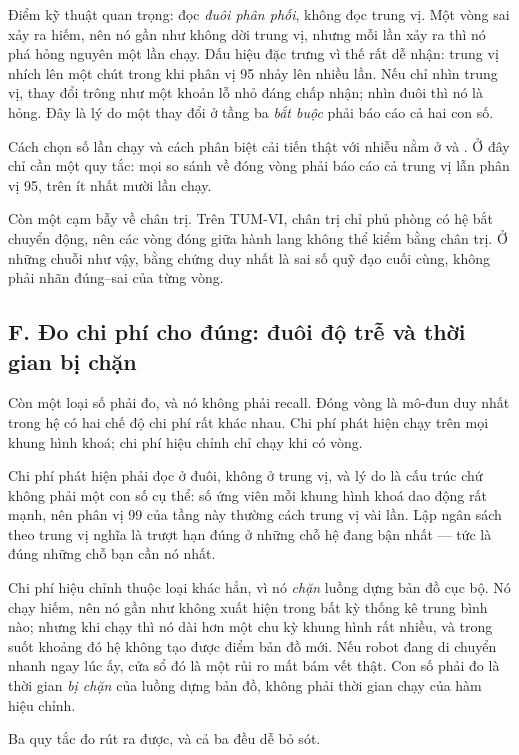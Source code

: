 \documentclass[../../deep_learning.tex]{subfiles}
\begin{document}
Điểm kỹ thuật quan trọng: đọc \emph{đuôi phân phối}, không đọc trung vị. Một vòng sai xảy ra hiếm, nên nó gần như không dời trung vị, nhưng mỗi lần xảy ra thì nó phá hỏng nguyên một lần chạy. Dấu hiệu đặc trưng vì thế rất dễ nhận: trung vị nhích lên một chút trong khi phân vị 95 nhảy lên nhiều lần. Nếu chỉ nhìn trung vị, thay đổi trông như một khoản lỗ nhỏ đáng chấp nhận; nhìn đuôi thì nó là hỏng. Đây là lý do một thay đổi ở tầng ba \emph{bắt buộc} phải báo cáo cả hai con số.

Cách chọn số lần chạy và cách phân biệt cải tiến thật với nhiễu nằm ở  và . Ở đây chỉ cần một quy tắc: mọi so sánh về đóng vòng phải báo cáo cả trung vị lẫn phân vị 95, trên ít nhất mười lần chạy.

Còn một cạm bẫy về chân trị. Trên TUM-VI, chân trị chỉ phủ phòng có hệ bắt chuyển động, nên các vòng đóng giữa hành lang không thể kiểm bằng chân trị. Ở những chuỗi như vậy, bằng chứng duy nhất là sai số quỹ đạo cuối cùng, không phải nhãn đúng--sai của từng vòng.

\subsection{F. Đo chi phí cho đúng: đuôi độ trễ và thời gian bị chặn}
Còn một loại số phải đo, và nó không phải recall. Đóng vòng là mô-đun duy nhất trong hệ có hai chế độ chi phí rất khác nhau. Chi phí phát hiện chạy trên mọi khung hình khoá; chi phí hiệu chỉnh chỉ chạy khi có vòng.

Chi phí phát hiện phải đọc ở đuôi, không ở trung vị, và lý do là cấu trúc chứ không phải một con số cụ thể: số ứng viên mỗi khung hình khoá dao động rất mạnh, nên phân vị 99 của tầng này thường cách trung vị vài lần. Lập ngân sách theo trung vị nghĩa là trượt hạn đúng ở những chỗ hệ đang bận nhất --- tức là đúng những chỗ bạn cần nó nhất.

Chi phí hiệu chỉnh thuộc loại khác hẳn, vì nó \emph{chặn} luồng dựng bản đồ cục bộ. Nó chạy hiếm, nên nó gần như không xuất hiện trong bất kỳ thống kê trung bình nào; nhưng khi chạy thì nó dài hơn một chu kỳ khung hình rất nhiều, và trong suốt khoảng đó hệ không tạo được điểm bản đồ mới. Nếu robot đang di chuyển nhanh ngay lúc ấy, cửa sổ đó là một rủi ro mất bám vết thật. Con số phải đo là thời gian \emph{bị chặn} của luồng dựng bản đồ, không phải thời gian chạy của hàm hiệu chỉnh.

Ba quy tắc đo rút ra được, và cả ba đều dễ bỏ sót.
\end{document}

